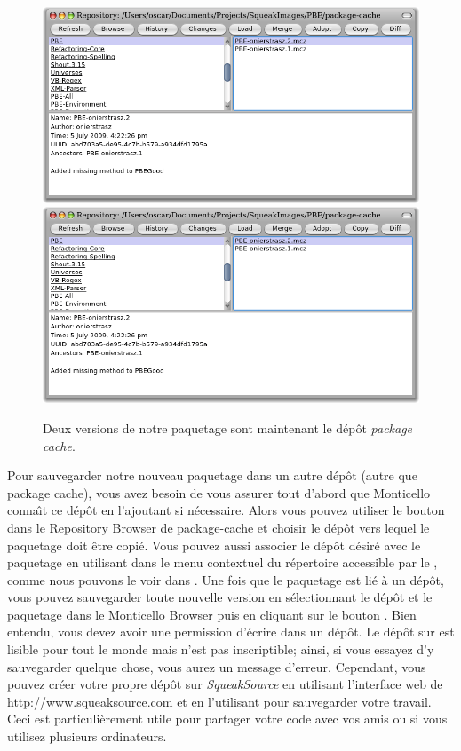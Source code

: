 \documentclass[a4paper,10pt,twoside]{book}
\begin{document}
\begin{figure}[tbp]
	\begin{center}
	\ifluluelse
		{\includegraphics[width=\textwidth]{package-cache-browser}}
		{\includegraphics[scale=0.7]{package-cache-browser}}
	\end{center}
	\caption{Deux versions de notre paquetage sont maintenant le d\'ep\^ot \emph{package cache}.}
	\label{fig:package-cache-browser}
\end{figure}

Pour sauvegarder notre nouveau paquetage dans un autre
d\'ep\^ot (autre que package cache), vous
avez besoin de vous assurer tout d'abord que Monticello conna\^{\i}t
ce d\'ep\^ot en l'ajoutant si n\'ecessaire.
Alors vous pouvez utiliser le bouton  dans le 
Repository Browser de package-cache et choisir le d\'ep\^ot vers lequel
le paquetage doit \^etre copi\'e.
Vous pouvez aussi associer le d\'ep\^ot d\'esir\'e avec le paquetage
en utilisant  
dans le menu contextuel du r\'epertoire accessible par le , comme
nous pouvons le voir dans .
Une fois que le paquetage est li\'e \`a un d\'ep\^ot, vous pouvez sauvegarder
toute nouvelle version en s\'electionnant le d\'ep\^ot et le paquetage
dans le Monticello Browser puis en cliquant sur le bouton 
 .  
Bien entendu, vous devez avoir une permission d'\'ecrire dans un d\'ep\^ot.
Le d\'ep\^ot  sur  est
lisible pour tout le monde mais n'est pas inscriptible; ainsi, si vous
essayez d'y sauvegarder quelque chose, vous aurez un message d'erreur.
Cependant, vous pouvez cr\'eer votre propre d\'ep\^ot sur 
\emph{SqueakSource} en utilisant l'interface web de \url{http://www.squeaksource.com} et en l'utilisant pour sauvegarder votre travail.
Ceci est particuli\`erement utile pour partager votre code avec vos amis ou
si vous utilisez plusieurs ordinateurs.
\end{document}
